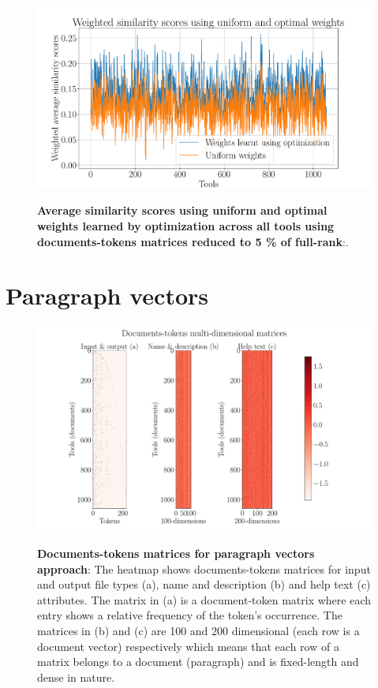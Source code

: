 \begin{figure}[h]
\begin{centering}
    {\includegraphics[scale=0.4]{figures/Optimization_005_lsi.pdf}}
    \caption[Average of the weighted similarity scores for computed using documents-tokens matrices reduced to 5 \% of full-rank across all tools]{\textbf{Average similarity scores using uniform and optimal weights learned by optimization across all tools using documents-tokens matrices reduced to 5 \% of full-rank}:.}
\end{centering}
\end{figure}


\section{Paragraph vectors}

\begin{figure}[h]
\begin{centering}
    {\includegraphics[scale=0.4]{figures/Documents-tokens_doc2vec.pdf}}
    \caption[Documents-tokens matrices for paragraph vectors approach]{\textbf{Documents-tokens matrices for paragraph vectors approach}: The heatmap shows documents-tokens matrices for input and output file types (a), name and description (b) and help text (c) attributes. The matrix in (a) is a document-token matrix where each entry shows a relative frequency of the token's occurrence. The matrices in (b) and (c) are 100 and 200 dimensional (each row is a document vector) respectively which means that each row of a matrix belongs to a document (paragraph) and is fixed-length and dense in nature. }
\end{centering}
\end{figure}

